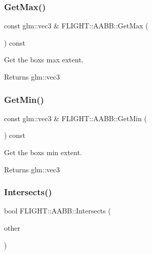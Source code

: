 \subsubsection{\texorpdfstring{Get\+Max()}{GetMax()}}
{\footnotesize\ttfamily const glm\+::vec3 \& F\+L\+I\+G\+H\+T\+::\+A\+A\+B\+B\+::\+Get\+Max (\begin{DoxyParamCaption}{ }\end{DoxyParamCaption}) const}



Get the box\textquotesingle{}s max extent. 

\begin{DoxyReturn}{Returns}
glm\+::vec3 
\end{DoxyReturn}
\mbox{\label{class_f_l_i_g_h_t_1_1_a_a_b_b_ae0313494cc7b8cff65782b5ba9499c00}} 
\subsubsection{\texorpdfstring{Get\+Min()}{GetMin()}}
{\footnotesize\ttfamily const glm\+::vec3 \& F\+L\+I\+G\+H\+T\+::\+A\+A\+B\+B\+::\+Get\+Min (\begin{DoxyParamCaption}{ }\end{DoxyParamCaption}) const}



Get the box\textquotesingle{}s min extent. 

\begin{DoxyReturn}{Returns}
glm\+::vec3 
\end{DoxyReturn}
\mbox{\label{class_f_l_i_g_h_t_1_1_a_a_b_b_ac9fdbd999e7cfd1623cfb95138efc2c2}} 
\subsubsection{\texorpdfstring{Intersects()}{Intersects()}}
{\footnotesize\ttfamily bool F\+L\+I\+G\+H\+T\+::\+A\+A\+B\+B\+::\+Intersects (\begin{DoxyParamCaption}\item[{const \hyperlink{class_f_l_i_g_h_t_1_1_a_a_b_b}{A\+A\+BB} \&}]{other }\end{DoxyParamCaption})}



